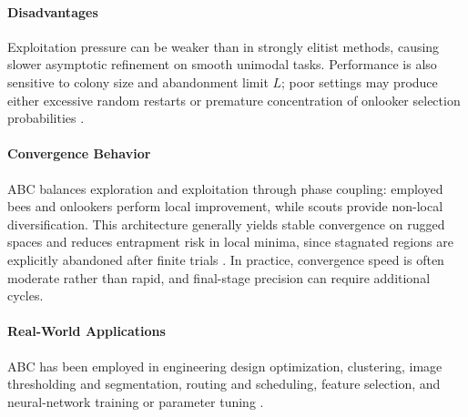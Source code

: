 \paragraph{Disadvantages}
Exploitation pressure can be weaker than in strongly elitist methods, causing slower asymptotic refinement on smooth unimodal tasks. Performance is also sensitive to colony size and abandonment limit $L$; poor settings may produce either excessive random restarts or premature concentration of onlooker selection probabilities \autocite{Karaboga2007}.

\paragraph{Convergence Behavior}
ABC balances exploration and exploitation through phase coupling: employed bees and onlookers perform local improvement, while scouts provide non-local diversification. This architecture generally yields stable convergence on rugged spaces and reduces entrapment risk in local minima, since stagnated regions are explicitly abandoned after finite trials \autocite{Karaboga2007}. In practice, convergence speed is often moderate rather than rapid, and final-stage precision can require additional cycles.

\paragraph{Real-World Applications}
ABC has been employed in engineering design optimization, clustering, image thresholding and segmentation, routing and scheduling, feature selection, and neural-network training or parameter tuning \autocite{Karaboga2007}.